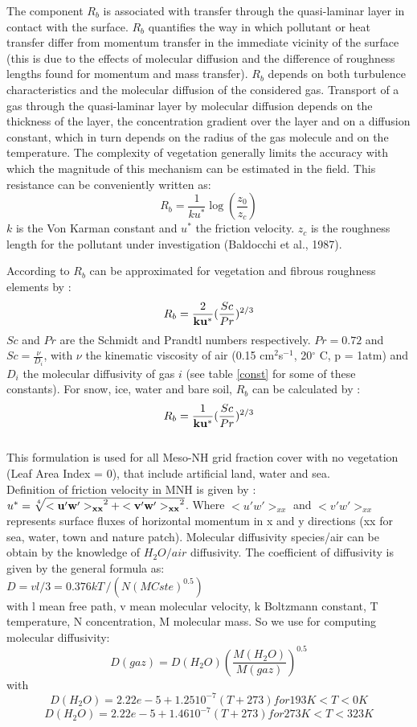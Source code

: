The component $R_b$ is associated with transfer through the quasi-laminar 
layer in contact with the surface. $R_b$ quantifies the way in which pollutant
or heat transfer differ from momentum transfer in the immediate vicinity of the
surface (this is due to the effects of molecular diffusion and the difference 
of roughness lengths found for momentum and mass transfer). 
$R_b$ depends on both turbulence characteristics and the molecular
diffusion of the considered gas. Transport of a gas through the
quasi-laminar layer by molecular diffusion depends on the thickness of the
layer, the concentration gradient over the layer and on a diffusion constant,
which in turn depends on the radius of the gas molecule and on the temperature.
The complexity of vegetation generally limits the accuracy with which the
magnitude of this mechanism can be estimated in the field. This resistance can
be conveniently written as:
\[ R_b=\frac{1}{k u^*} \log (\frac{z_0}{z_c})\]
$k$ is the Von Karman constant and $u^*$ the friction velocity.
$z_c$ is the roughness length for the pollutant under investigation (Baldocchi
et al., 1987). 

According to \citet{Hicks1987,Garrat1973}
$R_b$ can be approximated for vegetation and fibrous roughness elements by :
\[ R_b = \frac{2}{\bf{k} \bf{u^*}}(\frac{Sc}{Pr})^{2/3} \]
$Sc$ and $Pr$ are the Schmidt and Prandtl numbers respectively.
$Pr=0.72$ and $Sc=\frac{\nu}{D_i}$, with $\nu$ the kinematic viscosity of
air (0.15 cm$^2$s$^{-1}$, 20$^\circ$ C, p = 1atm) and $D_i$ the molecular
diffusivity of gas $i$ (see table \ref{const} for some of these
constants). 
For snow, ice, water and bare soil, $R_b$ can be calculated by
\citet{Ganzeveld1995}:\[ R_b =
\frac{1}{\bf{k} \bf{u^*}}(\frac{Sc}{Pr})^{2/3} \]\\
This formulation is used for all Meso-NH grid fraction cover with no
vegetation (Leaf Area Index = 0), that include artificial land, water
and sea.\\
Definition of friction velocity in MNH is given by : $u^* =
\sqrt[4]{{\bf {<u'w'>}_{xx}}^2+{\bf{<v'w'>}_{xx}}^2}$. Where $<u'w'>_{xx}$ and
$<v'w'>_{xx}$ represents   
surface fluxes of horizontal momentum in x and y directions (xx for sea,
water, town and nature patch).
Molecular diffusivity species/air  can be obtain by the knowledge of $H_2O/air$ diffusivity.
The coefficient of diffusivity is given by the general formula as:\\
$D = v l /3 = 0.376 k T \, / (N (M Cste)^{0.5})$\\
with
l mean free path,
v mean molecular velocity,
k Boltzmann constant,
T temperature,
N concentration,
M molecular mass.
So we use for computing molecular diffusivity: \\ 
$$
D(gaz)=D(H_2O) \left(\frac{M(H_2O)}{M(gaz)} \right)^{0.5}
$$
with 
$$
D(H_2O)= 2.22e-5 + 1.25 10^{-7} (T + 273)  for 193 K < T < 0 K
$$
$$
D(H_2O)= 2.22e-5 + 1.46 10^{-7} (T + 273)  for 273 K < T < 323 K 
$$

